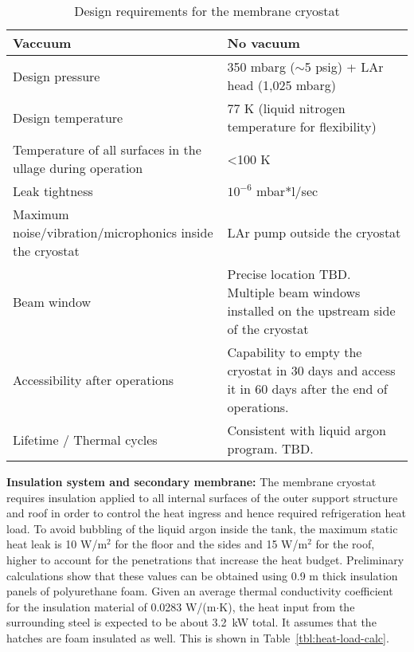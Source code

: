 \begin{table}[htpb]
\begin{tabular}{|p{}|p{}|}
 Vaccuum  &  No vacuum \\ \hline
 Design pressure  &  350 mbarg ($\sim$5 psig) + LAr head (1,025 mbarg) \\ \hline
Design temperature   &  77 K (liquid nitrogen temperature for flexibility) \\ \hline
Temperature of all surfaces in the ullage during operation   & \textless 100 K  \\ \hline
Leak tightness   & $10^{-6}$ mbar*l/sec   \\ \hline
Maximum noise/vibration/microphonics inside the cryostat   & LAr pump outside the cryostat  \\ \hline
Beam window   & Precise location TBD. Multiple beam windows installed on the upstream side of the cryostat  \\ \hline
 Accessibility after operations  & Capability to empty the cryostat in 30 days and access it in 60 days after the end of operations. \\ \hline
  Lifetime / Thermal cycles &  Consistent with liquid argon program. TBD. \\ \hline
 \end{tabular}
\caption{Design requirements for the membrane cryostat}
\label{tbl:cryogenics-design-parameters}
\end{table}

\textbf{Insulation system and secondary membrane: }
%
The membrane cryostat requires insulation applied to all internal surfaces of the outer support structure 
and roof in order to control the heat ingress and hence required refrigeration heat load. 
To avoid bubbling of the liquid argon inside the tank, the maximum static heat leak is 10 W/m$^2$ for the floor and the sides and 15 W/m$^2$ for the roof, higher to account for the penetrations that increase the heat budget. Preliminary calculations show that these values can be obtained using 0.9 m thick insulation panels of polyurethane foam.
Given an 
average thermal conductivity coefficient for the insulation material of 0.0283 W/(m$\cdot$K), the heat input 
from the surrounding steel is expected to be about 3.2~kW total. It assumes that the hatches are foam 
insulated as well. This is shown in Table~\ref{tbl:heat-load-calc}.

